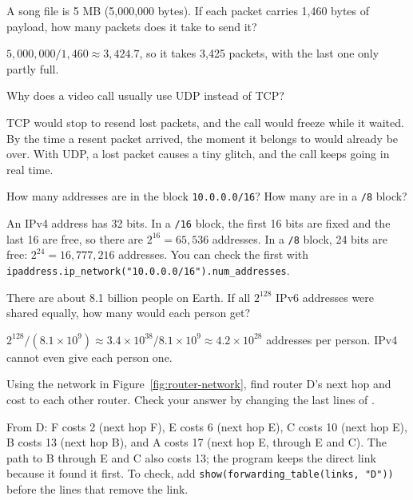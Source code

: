 \begin{Exercise}[title={Counting Packets}, label=in_packets]
A song file is 5 MB (5,000,000 bytes). If each packet carries 1,460 bytes of payload, how many packets does
it take to send it?
\end{Exercise}
\begin{Answer}[ref=in_packets]
$5{,}000{,}000 / 1{,}460 \approx 3{,}424.7$, so it takes 3,425 packets, with the last one only partly full.
\end{Answer}

\begin{Exercise}[title={Video Calls}, label=in_udp]
Why does a video call usually use UDP instead of TCP?
\end{Exercise}
\begin{Answer}[ref=in_udp]
TCP would stop to resend lost packets, and the call would freeze while it waited. By the time a resent
packet arrived, the moment it belongs to would already be over. With UDP, a lost packet causes a tiny
glitch, and the call keeps going in real time.
\end{Answer}

\begin{Exercise}[title={Sizes of Networks}, label=in_prefix]
How many addresses are in the block \verb|10.0.0.0/16|? How many are in a \verb|/8| block?
\end{Exercise}
\begin{Answer}[ref=in_prefix]
An IPv4 address has 32 bits. In a \verb|/16| block, the first 16 bits are fixed and the last 16 are free, so
there are $2^{16} = 65{,}536$ addresses. In a \verb|/8| block, 24 bits are free: $2^{24} = 16{,}777{,}216$
addresses. You can check the first with
\verb|ipaddress.ip_network("10.0.0.0/16").num_addresses|.
\end{Answer}

\begin{Exercise}[title={Enough for Everyone?}, label=in_ipv6]
There are about 8.1 billion people on Earth. If all $2^{128}$ IPv6 addresses were shared equally, how many
would each person get?
\end{Exercise}
\begin{Answer}[ref=in_ipv6]
$2^{128} / (8.1 \times 10^9) \approx 3.4 \times 10^{38} / 8.1 \times 10^9 \approx 4.2 \times 10^{28}$ addresses
per person. IPv4 cannot even give each person one.
\end{Answer}

\begin{Exercise}[title={Router D's Table}, label=in_tableD]
Using the network in Figure~\ref{fig:router-network}, find router D's next hop and cost to each other router.
Check your answer by changing the last lines of .
\end{Exercise}
\begin{Answer}[ref=in_tableD]
From D: F costs 2 (next hop F), E costs 6 (next hop E), C costs 10 (next hop E), B costs 13 (next hop B),
and A costs 17 (next hop E, through E and C). The path to B through E and C also costs 13; the program keeps
the direct link because it found it first. To check, add \verb|show(forwarding_table(links, "D"))| before the
lines that remove the link.
\end{Answer}

